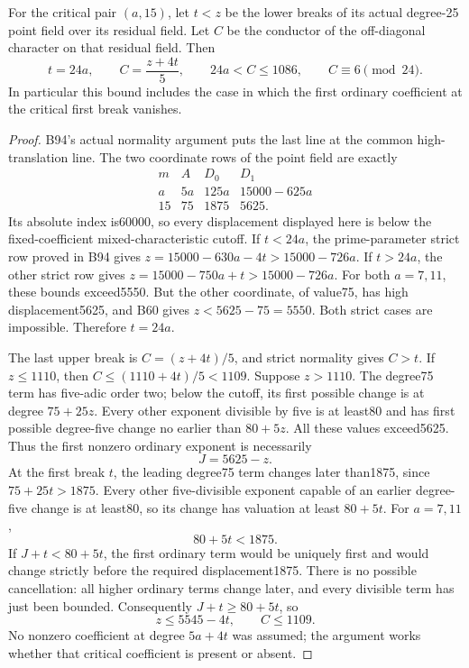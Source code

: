 \begin{lemma}
\label{lem:B-RD95-critical}
For the critical pair $(a,15)$, let $t<z$ be the lower breaks of
its actual degree-25 point field over its residual field. Let $C$
be the conductor of the off-diagonal character on that residual
field. Then
\[
       t=24a,\qquad C=\frac{z+4t}{5},\qquad
       24a<C\le1086,\qquad C\equiv6\pmod {24}.        \tag{B-RD95.2}
\]
In particular this bound includes the case in which the first
ordinary coefficient at the critical first break vanishes.
\end{lemma}
\begin{proof}
B94's actual normality argument puts the last line at the common
high-translation line. The two coordinate rows of the point field
are exactly
\[
\begin{array}{c|r|r|r}
 m&A&D_0&D_1\\\hline
 a&5a&125a&15000-625a\\
 15&75&1875&5625.
\end{array}                                           \tag{B-RD95.3}
\]
Its absolute index is60000, so every displacement displayed here
is below the fixed-coefficient mixed-characteristic cutoff.
If $t<24a$, the prime-parameter strict row proved in B94 gives
$z=15000-630a-4t>15000-726a$. If $t>24a$, the other strict row
gives $z=15000-750a+t>15000-726a$. For both $a=7,11$, these
bounds exceed5550. But the other coordinate, of value75, has
high displacement5625, and B60 gives $z<5625-75=5550$.
Both strict cases are impossible. Therefore $t=24a$.

The last upper break is $C=(z+4t)/5$, and strict normality gives
$C>t$. If $z\le1110$, then
$C\le(1110+4t)/5<1109$. Suppose $z>1110$. The degree75 term
has five-adic order two; below the cutoff, its first possible
change is at degree $75+25z$. Every other exponent divisible by
five is at least80 and has first possible degree-five change no
earlier than $80+5z$. All these values exceed5625. Thus the first
nonzero ordinary exponent is necessarily
\[
                         J=5625-z.                  \tag{B-RD95.4}
\]
At the first break $t$, the leading degree75 term changes later
than1875, since $75+25t>1875$. Every other five-divisible exponent
capable of an earlier degree-five change is at least80, so its
change has valuation at least $80+5t$. For $a=7,11$,
\[
                            80+5t<1875.              \tag{B-RD95.5}
\]
If $J+t<80+5t$, the first ordinary term would be uniquely first
and would change strictly before the required displacement1875.
There is no possible cancellation: all higher ordinary terms
change later, and every divisible term has just been bounded.
Consequently $J+t\ge80+5t$, so
\[
             z\le5545-4t,\qquad C\le1109.            \tag{B-RD95.6}
\]
No nonzero coefficient at degree $5a+4t$ was assumed; the argument
works whether that critical coefficient is present or absent.


\end{proof}
